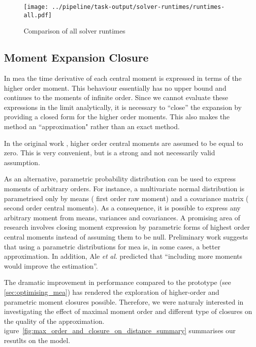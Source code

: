 \begin{figure}[bt]
    \centering
    \texttt{[image: ../pipeline/task-output/solver-runtimes/runtimes-all.pdf]}
    \caption{Comparison of all solver runtimes}
    \label{fig:solver-runtimes}
\end{figure}


\subsection{Moment Expansion Closure}

In \gls{mea} the time derivative of each central moment is expressed in terms of the higher order moment. 
This behaviour essentially has no upper bound and continues to the moments of infinite order. 
Since we cannot evaluate these expressions in the limit analytically, it is necessary to ``close'' the expansion by providing a closed form for the higher order moments.
This also makes the method an ``approximation" rather than an exact method.

In the original work \cite{ale_general_2013}, higher order central moments are assumed to be equal to zero.
This is very convenient, but is a strong and not necessarily valid assumption. 

As an alternative, parametric probability distribution can be used to express moments of arbitrary orders. 
For instance, a multivariate normal distribution is parametrised only by means (\ie{} first order raw moment)
and a covariance matrix (\ie{} second order central moments). 
As a consequence, it is possible to express any arbitrary moment from means, variances and covariances. 
A promising area of research involves closing moment expression by parametric forms of highest order central moments instead
of assuming them to be null.
Preliminary work  suggests that using a parametric distributions for \gls{mea} is, in some cases, a better approximation.
In addition, Ale \emph{et al.} predicted that ``including more moments would improve the estimation''\cite{ale_general_2013}.

The dramatic improvement in performance compared to the \mat{} prototype (see \autoref{sec:optimising_mea}) has rendered the exploration of higher-order and parametric moment closures possible.
Therefore, we were naturaly interested in investigating the effect of maximal moment order and different type of closures on the quality of the approximation.
igure~\ref{fig:max_order_and_closure_on_distance_summary} summarises our resutlts on the \pft{} model.


